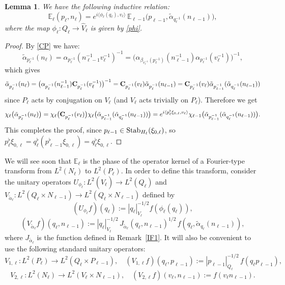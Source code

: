 \documentclass[a4paper,11pt,reqno]{amsart}
\numberwithin{equation}{section}
\newtheorem{lemma}[theorem]{Lemma}
\theoremstyle{remark}
\theoremstyle{definition}
\newcommand{\E}{\mathbb E}
\begin{document}
\begin{lemma}
\label{RecE}
We have the following inductive relation:
$$
\E_\ell(p_\ell ,n_\ell)=e^{i\langle \phi_\ell(q_\ell),v_\ell\rangle}\,\E_{\ell-1}\big(p_{\ell-1} ,\tilde\alpha_{q_\ell^{-1}}(n_{\ell-1})\big),
$$
where the map $\phi_\ell:Q_\ell\to\hat V_\ell$ is given by \eqref{phi}.
\end{lemma}
\begin{proof}
By \eqref{CP} we have:
$$
\tilde\alpha_{ p_\ell^{-1}}(n_\ell)=\alpha_{ p_\ell^{-1}}(n_{\ell-1}^{-1}v_\ell^{-1})^{-1}=
\big(\alpha_{ \beta_{v_\ell^{-1}}(p_\ell^{-1})}(n_{\ell-1}^{-1})\alpha_{ p_\ell^{-1}}(v_\ell^{-1})\big)^{-1},
$$
which gives
$$
\tilde\alpha_{ p_\ell^{-1}}(n_\ell)=
\big(\alpha_{ p_\ell^{-1}}(n_{\ell-1}^{-1}){\bf C}_{ p_\ell^{-1}}(v_\ell^{-1})\big)^{-1}={\bf C}_{ p_\ell^{-1}}(v_\ell)\tilde\alpha_{ p_\ell^{-1}}(n_{\ell-1})
={\bf C}_{ p_\ell^{-1}}(v_\ell)\tilde\alpha_{ p_{\ell-1}^{-1}}(\tilde\alpha_{q_\ell^{-1}}(n_{\ell-1}))
$$
since $P_\ell$ acts by conjugation on $V_\ell$ (and $V_\ell$ acts trivially on $P_\ell$).
Therefore we get
$$
\chi_\ell\big(\tilde\alpha_{ p_\ell^{-1}}(n_\ell)\big)=\chi_\ell\big({\bf C}_{ p_\ell^{-1}}(v_\ell)\big)\chi_\ell\big(\tilde\alpha_{ p_{\ell-1}^{-1}}(\tilde\alpha_{q_\ell^{-1}}(n_{\ell-1}))\big)
=e^{i\langle p_\ell^\flat\xi_{0,\ell},v_\ell\rangle}\chi_{\ell-1}\big(\tilde\alpha_{ p_{\ell-1}^{-1}}(\tilde\alpha_{q_\ell^{-1}}(n_{\ell-1}))\big).
$$
This completes the proof, since  $p_{\ell-1}\in{\rm Stab}_{H_\ell}(\xi_{0,\ell})$, so $p_\ell^\flat\xi_{0,\ell}=q_\ell^{\flat}(p_{\ell-1}^\flat \xi_{0,\ell})=q_\ell^{\flat}\xi_{0,\ell}$.
\end{proof}




We will see soon that $\E_\ell$ is the phase of the operator kernel of a Fourier-type  transform from $L^2(N_\ell)$ to $L^2(P_\ell)$.
In order to define this transform, consider the unitary  operators $U_{\phi_\ell}:L^2(\hat V_\ell)\to L^2(Q_\ell)$ and $V_{\tilde\alpha_\ell}:L^2(Q_\ell\times N_{\ell-1})\to L^2(Q_\ell\times N_{\ell-1})$ defined by
$$
(U_{\phi_\ell}f)(q_\ell):=|q_\ell |_{V_\ell}^{-1/2}f(\phi_\ell(q_\ell)),
$$
$$
(V_{\tilde\alpha_\ell}f)(q_\ell,n_{\ell-1}):= |q_\ell|_{V_\ell}^{-1/2}\,
J_{\tilde\alpha_\ell}(q_\ell,n_{\ell-1})^{1/2}\,
f(q_\ell,\tilde\alpha_{q_\ell}(n_{\ell-1})),
$$
where $J_{\tilde\alpha_\ell}$ is the function defined in Remark~\ref{IF1}.
It will also be convenient to use the following standard unitary operators:
$$
V_{1,\ell}:L^2(P_\ell)\to L^2(Q_\ell\times P_{\ell-1}),\quad (V_{1,\ell}f)(q_\ell,p_{\ell-1}):= |p_{\ell-1}|_{Q_\ell}^{-1/2}\,f(q_\ell p_{\ell-1}),
$$
$$
V_{2,\ell}:L^2(N_\ell)\to L^2(V_\ell \times N_{\ell-1}),\quad (V_{2,\ell}f)(v_\ell,n_{\ell-1}):=f(v_\ell n_{\ell-1}).
$$
\end{document}
